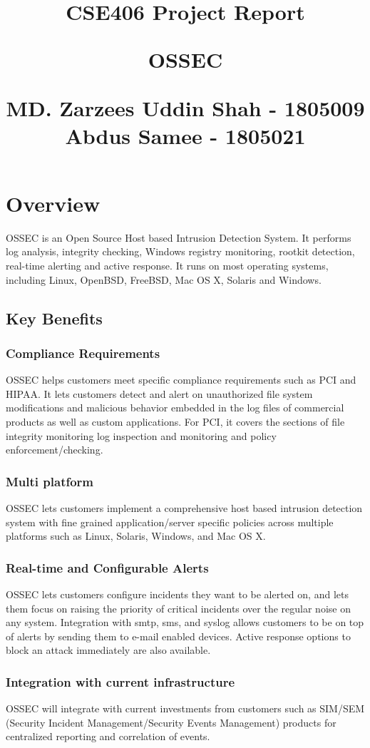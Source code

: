 \documentclass{article}
\title{%
  \begin{center}
        \vspace*{1cm}
                    
        \vspace{3cm}
        \LARGE
        CSE406 Project Report
            
        \vspace{1.5cm}
            
        \textbf{OSSEC}
                        
        \vspace{0.8cm}
                        
        \Large
        MD. Zarzees Uddin Shah - 1805009\\
        Abdus Samee - 1805021\\
    \end{center}
  }
\date{}
\begin{document}
\maketitle
\newpage
\section{Overview}
OSSEC is an Open Source Host based Intrusion Detection System. It performs log analysis, integrity checking, Windows registry monitoring, rootkit detection, real-time alerting and active response. It runs on most operating systems, including Linux, OpenBSD, FreeBSD, Mac OS X, Solaris and Windows. 
\subsection{Key Benefits}
\subsubsection{Compliance Requirements}
OSSEC helps customers meet specific compliance requirements such as PCI and HIPAA. It lets customers detect and alert on unauthorized file system modifications and malicious behavior embedded in the log files of commercial products as well as custom applications. For PCI, it covers the sections of file integrity monitoring  log inspection and monitoring  and policy enforcement/checking.
\subsubsection{Multi platform}
OSSEC lets customers implement a comprehensive host based intrusion detection system with fine grained application/server specific policies across multiple platforms such as Linux, Solaris, Windows, and Mac OS X.
\subsubsection{Real-time and Configurable Alerts}
OSSEC lets customers configure incidents they want to be alerted on, and lets them focus on raising the priority of critical incidents over the regular noise on any system. Integration with smtp, sms, and syslog allows customers to be on top of alerts by sending them to e-mail enabled devices. Active response options to block an attack immediately are also available.
\subsubsection{Integration with current infrastructure}
OSSEC will integrate with current investments from customers such as SIM/SEM (Security Incident Management/Security Events Management) products for centralized reporting and correlation of events.
\end{document}
